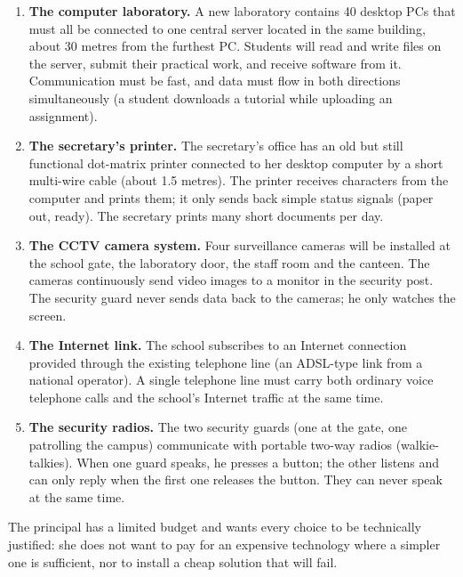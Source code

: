 \documentclass[11pt]{article}
\newcounter{popsec}
\newcounter{popsub}
\newcommand{\courssub}[1]{%
  \stepcounter{popsub}%
  \par\vspace{9pt}\noindent{\popxbold\fontsize{11.5}{13}\selectfont\color{popink}{\color{poporange}\thepopsec.\thepopsub}\hspace{6pt}#1}\par\nopagebreak\vspace{4pt}
}
\begin{document}
\begin{enumerate}
\item \textbf{The computer laboratory.} A new laboratory contains 40 desktop PCs that must all be connected to one central server located in the same building, about 30 metres from the furthest PC. Students will read and write files on the server, submit their practical work, and receive software from it. Communication must be fast, and data must flow in both directions simultaneously (a student downloads a tutorial while uploading an assignment).

\item \textbf{The secretary's printer.} The secretary's office has an old but still functional dot-matrix printer connected to her desktop computer by a short multi-wire cable (about 1.5 metres). The printer receives characters from the computer and prints them; it only sends back simple status signals (paper out, ready). The secretary prints many short documents per day.

\item \textbf{The CCTV camera system.} Four surveillance cameras will be installed at the school gate, the laboratory door, the staff room and the canteen. The cameras continuously send video images to a monitor in the security post. The security guard never sends data back to the cameras; he only watches the screen.

\item \textbf{The Internet link.} The school subscribes to an Internet connection provided through the existing telephone line (an ADSL-type link from a national operator). A single telephone line must carry both ordinary voice telephone calls and the school's Internet traffic at the same time.

\item \textbf{The security radios.} The two security guards (one at the gate, one patrolling the campus) communicate with portable two-way radios (walkie-talkies). When one guard speaks, he presses a button; the other listens and can only reply when the first one releases the button. They can never speak at the same time.
\end{enumerate}

The principal has a limited budget and wants every choice to be technically justified: she does not want to pay for an expensive technology where a simpler one is sufficient, nor to install a cheap solution that will fail.

\courssub{Tasks}
\end{document}
